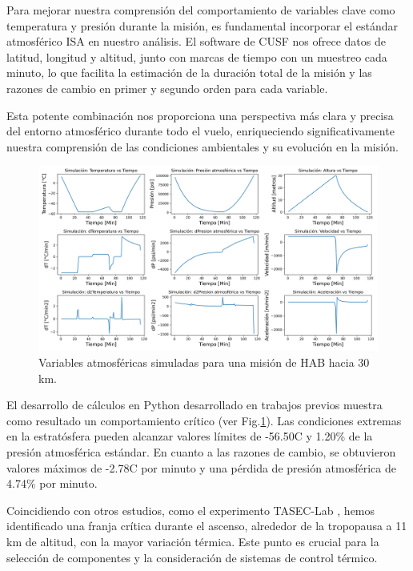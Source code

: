 Para mejorar nuestra comprensión del comportamiento de variables clave como temperatura y presión durante la misión, es fundamental incorporar el estándar atmosférico ISA en nuestro análisis. El software de CUSF nos ofrece datos de latitud, longitud y altitud, junto con marcas de tiempo con un muestreo cada minuto, lo que facilita la estimación de la duración total de la misión y las razones de cambio en primer y segundo orden para cada variable.

Esta potente combinación nos proporciona una perspectiva más clara y precisa del entorno atmosférico durante todo el vuelo, enriqueciendo significativamente nuestra comprensión de las condiciones ambientales y su evolución en la misión.



\begin{figure}[hbt!]
\centering
\includegraphics[width=1\textwidth]{Pictures/EnviromentalVariables.png}
\caption{Variables atmosféricas simuladas para una misión de HAB hacia 30 km.}\label{fig:Ambiente}
\end{figure}

El desarrollo de cálculos en Python desarrollado en trabajos previos  \cite{stratoballoon_eps_batterytest} \cite{osmin-lab} muestra como resultado un comportamiento crítico (ver Fig.\ref{fig:Ambiente}). Las condiciones extremas en la estratósfera pueden alcanzar valores límites de -56.50\degree{}C y 1.20\% de la presión atmosférica estándar. En cuanto a las razones de cambio, se obtuvieron valores máximos de -2.78\degree{}C por minuto y una pérdida de presión atmosférica de 4.74\% por minuto.

Coincidiendo con otros estudios, como el experimento TASEC-Lab \cite{TASEC}, hemos identificado una franja crítica durante el ascenso, alrededor de la tropopausa a 11 km de altitud, con la mayor variación térmica. Este punto es crucial para la selección de componentes y la consideración de sistemas de control térmico.



